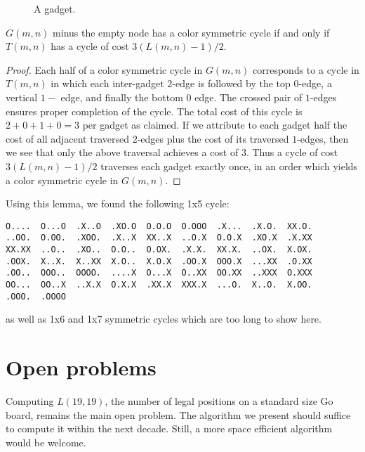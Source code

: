 \documentclass{article}
\begin{document}
\begin{figure}
\begin{center}
\epsfxsize=4cm 
\end{center}
\caption{A gadget.}
\label{gadget}
\end{figure}

\begin{lemma}
$G(m,n)$ minus the empty node has a color symmetric cycle if and only if
$T(m,n)$ has a cycle of cost $3(L(m,n)-1)/2$.
\end{lemma}

\begin{proof}
Each half of a color symmetric cycle in $G(m,n)$ corresponds
to a cycle in $T(m,n)$
in which each inter-gadget $2$-edge is followed by
the top $0$-edge, a vertical $1-$ edge, and finally the bottom $0$ edge.
The crossed pair of $1$-edges ensures proper completion of the cycle.
The total cost of this cycle is $2+0+1+0=3$ per gadget as claimed.
If we attribute to each gadget half the cost of all adjacent traversed
$2$-edges plus the cost of its traversed $1$-edges, then we see that
only the above traversal achieves a cost of $3$. Thus a cycle of cost
$3(L(m,n)-1)/2$ traverses each gadget exactly once, in an order
which yields a color symmetric cycle in $G(m,n)$.
\end{proof}

Using this lemma, we found the following 1x5 cycle:
\begin{verbatim} 
O....  O...O  .X..O  .XO.O  O.O.O  O.OOO  .X...  .X.O.  XX.O.
..OO.  O.OO.  .XOO.  .X..X  XX..X  ..O.X  O.O.X  .XO.X  .X.XX
XX.XX  ..O..  .XO..  O.O..  O.OX.  .X.X.  XX.X.  ..OX.  X.OX.
.OOX.  X..X.  X..XX  X.O..  X.O.X  .OO.X  OOO.X  ...XX  .O.XX
.OO..  OOO..  OOOO.  ....X  O...X  O..XX  OO.XX  ..XXX  O.XXX
OO...  OO..X  ..X.X  O.X.X  .XX.X  XXX.X  ...O.  X..O.  X.OO.
.OOO.  .OOOO
\end{verbatim} 
as well as 1x6 and 1x7 symmetric cycles which are too long to show here.


\section{Open problems}
Computing $L(19,19)$, the number of
legal positions on a standard size Go board,
remains the main open problem.
The algorithm we present should suffice to compute it
within the next decade.
Still, a more space efficient algorithm would be welcome.
\end{document}
